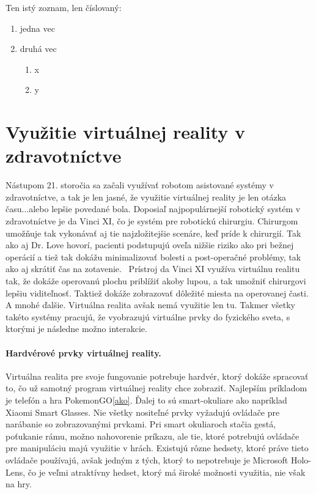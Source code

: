 \documentclass[10pt,twoside,a4paper]{article}
\begin{document}
Ten istý zoznam, len číslovaný:

\begin{enumerate}
\item jedna vec
\item druhá vec
	\begin{enumerate}
	\item x
	\item y
	\end{enumerate}
\end{enumerate}


\section{Využitie virtuálnej reality v zdravotníctve} \label{zdravotnictvo}
Nástupom 21. storočia sa začali využívať robotom asistované systémy v zdravotníctve, a tak je len jasné, že využitie virtuálnej reality je len otázka času...alebo lepšie povedané bola. Doposiaľ najpopulárnejší robotický systém v zdravotníctve je da Vinci XI, čo je systém pre robotickú chirurgiu. Chirurgom umožňuje tak vykonávať aj tie najzložitejšie scenáre, keď príde k chirurgií. Tak ako aj Dr. Love hovorí, pacienti podstupujú oveľa nižšie riziko ako pri bežnej operácií a tiež tak dokážu minimalizovať bolesti a post-operačné problémy, tak ako aj skrátiť čas na zotavenie.~\cite{XiRobots}
Prístroj da Vinci XI využíva virtuálnu realitu tak, že dokáže operovanú plochu priblížiť akoby lupou, a tak umožniť chirurgovi lepšiu viditeľnosť. Taktiež dokáže zobrazovať dôležité miesta na operovanej časti. A mnohé ďalšie. Virtuálna realita avšak nemá využitie len tu. Takmer všetky takéto systémy pracujú, že vyobrazujú virtuálne prvky do fyzického sveta, s ktorými je následne možno interakcie. 

\paragraph{Hardvérové prvky virtuálnej reality.}
Virtuálna realita pre svoje fungovanie potrebuje hardvér, ktorý dokáže spracovať to, čo už samotný program virtuálnej reality chce zobraziť. Najlepším príkladom je telefón a hra PokemonGO\ref{ako}. Ďalej to sú smart-okuliare ako napríklad Xiaomi Smart Glasses. Nie všetky nositeľné prvky vyžadujú ovládače pre narábanie so zobrazovanými prvkami. Pri smart okuliaroch stačia gestá, poťukanie rámu, možno nahovorenie príkazu, ale tie, ktoré potrebujú ovládače pre manipuláciu majú využitie v hrách. Existujú rôzne hedsety, ktoré práve tieto ovládače používajú, avšak jedným z tých, ktorý to nepotrebuje je Microsoft Holo-Lens, čo je veľmi atraktívny hedset, ktorý má široké možnosti využitia, nie však na hry.
\end{document}
